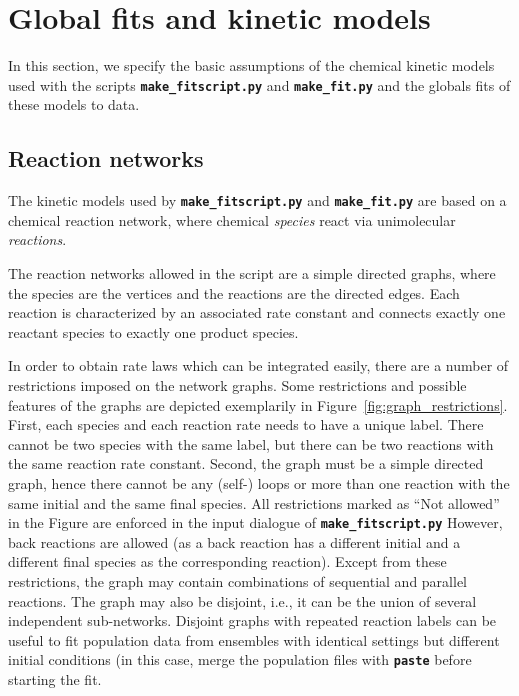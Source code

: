 \documentclass[a4paper,10pt,DIV=15,openany]{scrbook}
\newcommand{\ttt}[1]{\textbf{\texttt{#1}}}
\begin{document}

\section{Global fits and kinetic models}\label{met:globalfit}

In this section, we specify the basic assumptions of the chemical kinetic models used with the scripts \ttt{make\_fitscript.py} and \ttt{make\_fit.py} and the globals fits of these models to data.

\subsection{Reaction networks}

The kinetic models used by \ttt{make\_fitscript.py} and \ttt{make\_fit.py} are based on a chemical reaction network, where chemical \textit{species} react via unimolecular \textit{reactions}.

The reaction networks allowed in the script are a simple directed graphs, where the species are the vertices and the reactions are the directed edges.
Each reaction is characterized by an associated rate constant and connects exactly one reactant species to exactly one product species.

In order to obtain rate laws which can be integrated easily, there are a number of restrictions imposed on the network graphs.
Some restrictions and possible features of the graphs are depicted exemplarily in Figure~\ref{fig:graph_restrictions}.
First, each species and each reaction rate needs to have a unique label. 
There cannot be two species with the same label, but there can be two reactions with the same reaction rate constant.
Second, the graph must be a simple directed graph, hence there cannot be any (self-) loops or more than one reaction with the same initial and the same final species.
All restrictions marked as ``Not allowed'' in the Figure are enforced in the input dialogue of \ttt{make\_fitscript.py}
However, back reactions are allowed (as a back reaction has a different initial and a different final species as the corresponding reaction).
Except from these restrictions, the graph may contain combinations of sequential and parallel reactions.
The graph may also be disjoint, i.e., it can be the union of several independent sub-networks.
Disjoint graphs with repeated reaction labels can be useful to fit population data from ensembles with identical settings but different initial conditions (in this case, merge the population files with \ttt{paste} before starting the fit.
\end{document}
